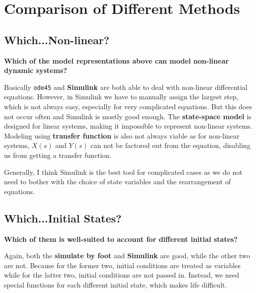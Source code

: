 \documentclass{article}
\begin{document}
  \section{Comparison of Different Methods}
  \subsection{Which...Non-linear?}
  \textbf{Which of the model representations above can model non-linear dynamic systems?}\par
  Basically \verb+ode45+ and \textbf{Simulink} are both able to deal with non-linear differential equations. However, in Simulink we have to manually assign the largest step, which is not always easy, especially for very complicated equations. But this does not occur often and Simulink is mostly good enough. The \textbf{state-space model} is designed for linear systems, making it impossible to represent non-linear systems. Modeling using \textbf{transfer function} is also not always viable as for non-linear systems, $X(s)$ and $Y(s)$ can not be factored out from the equation, disabling us from getting a transfer function.\par
  Generally, I think Simulink is the best tool for complicated cases as we do not need to bother with the choice of state variables and the rearrangement of equations.
  
  \subsection{Which...Initial States?}
  \textbf{Which of them is well-suited to account for different initial states?}\par
  Again, both the \textbf{simulate by foot} and \textbf{Simulink} are good, while the other two are not. Because for the former two, initial conditions are treated as variables while for the latter two, initial conditions are not passed in. Instead, we need special functions for each different initial state, which makes life difficult.
  
  \clearpage
\end{document}
